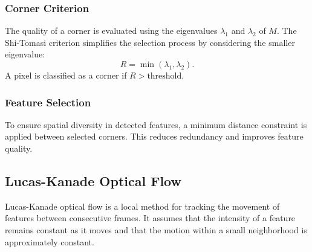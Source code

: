 \documentclass[11pt, conference, letterpaper]{IEEEtran}
\begin{document}

\bigskip


\subsubsection{Corner Criterion}
The quality of a corner is evaluated using the eigenvalues \(\lambda_1\) and \(\lambda_2\) of \(M\). The Shi-Tomasi criterion simplifies the selection process by considering the smaller eigenvalue:
\begin{equation}
R = \min(\lambda_1, \lambda_2).
\end{equation}
A pixel is classified as a corner if \(R > \text{threshold}\).
\bigskip

\subsubsection{Feature Selection}
To ensure spatial diversity in detected features, a minimum distance constraint is applied between selected corners. This reduces redundancy and improves feature quality.
\bigskip


\subsection{Lucas-Kanade Optical Flow}
Lucas-Kanade optical flow is a local method for tracking the movement of features between consecutive frames. It assumes that the intensity of a feature remains constant as it moves and that the motion within a small neighborhood is approximately constant.
\end{document}

